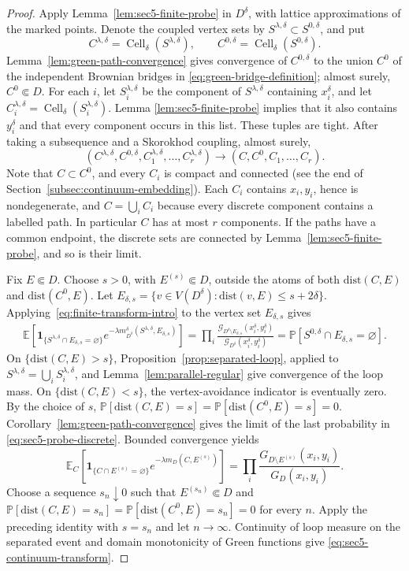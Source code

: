 \documentclass[11pt]{article}
\numberwithin{equation}{section}
\newcommand{\E}{\mathbb{E}}
\newcommand{\1}{\mathbf{1}}
\newcommand{\dist}{\mathrm{dist}}
\newcommand{\one}{\mathbf 1}
\newcommand{\Prob}{\mathbb P}
\newcommand{\Gc}{\mathcal G}
\newcommand{\Cell}{\operatorname{Cell}}
\begin{document}
\begin{proof}
Apply Lemma~\ref{lem:sec5-finite-probe} in \(D^\delta\), with lattice
approximations of the marked points.  Denote the coupled vertex sets by
\(S^{\lambda,\delta}\subset S^{0,\delta}\), and put
\[
 C^{\lambda,\delta}=\Cell_\delta(S^{\lambda,\delta}),
 \qquad C^{0,\delta}=\Cell_\delta(S^{0,\delta}).
\]
Lemma~\ref{lem:green-path-convergence} gives convergence of \(C^{0,\delta}\) to the union \(C^0\) of the independent Brownian bridges in
 \eqref{eq:green-bridge-definition}; almost surely, \(C^0\Subset D\).  For each \(i\), let
 \(S_i^{\lambda,\delta}\) be the component of
 \(S^{\lambda,\delta}\) containing \(x_i^\delta\), and let
 \(C_i^{\lambda,\delta}=\Cell_\delta(S_i^{\lambda,\delta})\).  Lemma
 \ref{lem:sec5-finite-probe} implies that it also contains \(y_i^\delta\)
 and that every component occurs in this list.  These tuples are tight.  After taking a subsequence and a Skorokhod coupling, almost surely,
 \[
 (C^{\lambda,\delta},C^{0,\delta},C_1^{\lambda,\delta},\ldots,
 C_r^{\lambda,\delta})
 \longrightarrow(C,C^0,C_1,\ldots,C_r).
 \]
 Note that \(C\subset C^0\), and every \(C_i\) is compact and connected (see the end of Section~\ref{subsec:continuum-embedding}).
Each \(C_i\) contains \(x_i,y_i\), hence is
nondegenerate, and \(C=\bigcup_iC_i\) because every discrete component
contains a labelled path.  In particular \(C\) has at most \(r\)
components.  If the paths have a common endpoint, the discrete sets are
connected by Lemma~\ref{lem:sec5-finite-probe}, and so is their limit.

Fix \(E\Subset D\).  Choose \(s>0\), with \(E^{(s)}\Subset D\), outside the
atoms of both \(\dist(C,E)\) and \(\dist(C^0,E)\).  Let
\(
 E_{\delta,s}=\{v\in V(D^\delta):\dist(v,E)\leq s+2\delta\}
\).
Applying~\eqref{eq:finite-transform-intro} to the vertex set \(E_{\delta,s}\) gives
\begin{align}\label{eq:sec5-probe-discrete}
 \E\left[\one_{\{S^{\lambda,\delta}\cap E_{\delta,s}=\varnothing\}}
 e^{-\lambda m_{D^\delta}^\delta
 (S^{\lambda,\delta},E_{\delta,s})}\right] =
 \prod_i\frac{\Gc_{D^\delta\setminus E_{\delta,s}}
 (x_i^\delta,y_i^\delta)}{\Gc_{D^\delta}(x_i^\delta,y_i^\delta)}
 =\Prob[S^{0,\delta}\cap E_{\delta,s}=\varnothing].
\end{align}
On \(\{\dist(C,E)>s\}\), Proposition~\ref{prop:separated-loop}, applied to
\(S^{\lambda,\delta}=\bigcup_iS_i^{\lambda,\delta}\), and
Lemma~\ref{lem:parallel-regular} give convergence of the loop mass.  On
\(\{\dist(C,E)<s\}\), the vertex-avoidance indicator is eventually zero.
By the choice of \(s\),
\(\Prob[\dist(C,E)=s]=\Prob[\dist(C^0,E)=s]=0\).  Corollary~\ref{lem:green-path-convergence}
gives the limit of the last probability in
\eqref{eq:sec5-probe-discrete}.  Bounded convergence yields
\[
 \E_C\!\left[
 \one_{\{C\cap E^{(s)}=\varnothing\}}
 e^{-\lambda m_D(C,E^{(s)})}\right]
 =\prod_i\frac{G_{D\setminus E^{(s)}}(x_i,y_i)}{G_D(x_i,y_i)}.
\]
 Choose a sequence \(s_n\downarrow0\) such that \(E^{(s_n)}\Subset D\) and
\(\Prob[\dist(C,E)=s_n]=\Prob[\dist(C^0,E)=s_n]=0\) for every \(n\).  Apply the preceding identity with \(s=s_n\) and let \(n\to\infty\).
Continuity of loop measure on the
separated event and domain monotonicity of Green functions give \eqref{eq:sec5-continuum-transform}.


\end{proof}
\end{document}
